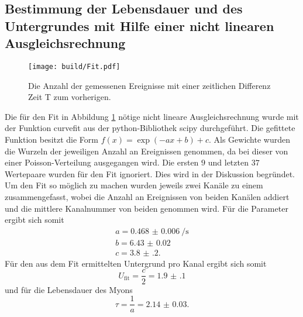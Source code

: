 \subsection{Bestimmung der Lebensdauer und des Untergrundes mit Hilfe einer nicht linearen Ausgleichsrechnung}
\label{subsec:Ausgleichs}
\begin{figure}
	\centering
	\texttt{[image: build/Fit.pdf]}
	\caption{Die Anzahl der gemessenen Ereignisse mit einer zeitlichen Differenz Zeit T zum vorherigen.}
	\label{fig:zweite}
\end{figure}
Die für den Fit in Abbildung \ref{fig:zweite} nötige nicht lineare Ausgleichsrechnung wurde mit der Funktion curvefit aus der python-Bibliothek scipy \cite{scipy} durchgeführt. Die gefittete Funktion besitzt die Form $f(x)=\exp(-a x +b)+c$. Als Gewichte wurden die Wurzeln der jeweiligen Anzahl an Ereignissen genommen, da bei dieser von einer Poisson-Verteilung ausgegangen wird. Die ersten $9$ und letzten $37$ Wertepaare wurden für den Fit ignoriert. Dies wird in der Diskussion begründet. Um den Fit so möglich zu machen wurden jeweils zwei Kanäle zu einem zusammengefasst, wobei die Anzahl an Ereignissen von beiden Kanälen addiert und die mittlere Kanalnummer von beiden genommen wird. %
Für die Parameter ergibt sich somit
\begin{gather*}
a=\SI{0.468(6)}{\per\second}\\
b=\num{6.43(2)}\\
c=\num{3.8(2)}.
\end{gather*}
Für den aus dem Fit ermittelten Untergrund pro Kanal ergibt sich somit
\begin{displaymath}
	U_\text{fit}=\frac{c}{2}=\num{1.9(1)}
\end{displaymath}
und für die Lebensdauer des Myons
\begin{displaymath}
	\tau=\frac{1}{a}=\num{2.14(3)}.
\end{displaymath}